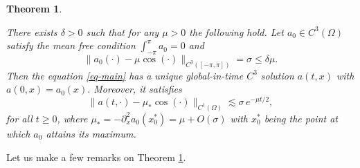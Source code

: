 \documentclass[12pt]{amsart}
\numberwithin{equation}{section}
\numberwithin{equation}{section}
\newtheorem{thm}{Theorem}[section]
\begin{document}
\begin{thm}\label{Th-main}

There exists $\delta>0$ such that for any $\mu>0$ the following hold. Let $a_0\in C^{3}(\Omega)$ satisfy the mean free condition $\int_{-\pi}^\pi a_0=0$ and
\begin{equation}\label{Th-icmain}
\|a_0(\cdot) -\mu \cos ( \cdot)\|_{C^3([-\pi,\pi])}= {\sigma} \leq \delta \mu.
\end{equation}
Then the equation \eqref{eq-main} has a unique global-in-time $C^3$ solution $a(t, x)$ with $a(0, x)=a_0(x).$ Moreover,  it satisfies
\begin{equation}\label{a-behavior}
\|a(t, \cdot)-\mu_* \cos(\cdot)\|_{C^1(\Omega)}\lesssim  {\sigma} \, e^{-\mu t/2},
\end{equation}
for all $t\geq 0$, where $\mu_*=-\partial_x^2 a_0(x^*_0)=\mu+O(\sigma)$ with $x_0^*$ being the point at which $a_0$ attains its maximum.

\end{thm}


Let us make a few remarks on Theorem \ref{Th-main}.
\end{document}
